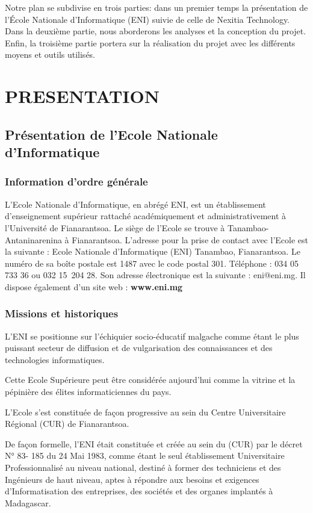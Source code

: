 \documentclass[12pt]{report}
\begin{document}
\begin{center}
\begin{minipage}{\textwidth}
					\hspace{15pt} Notre plan se subdivise en trois parties: dans un premier temps la présentation de l’École Nationale d'Informatique (ENI) suivie de celle de Nexitia Technology. Dans la deuxième partie, nous aborderons les analyses et la conception du projet. Enfin, la troisième partie portera sur la réalisation du projet avec les différents moyens et outils utilisés.
				\end{minipage}
			\end{center}
			\part{PRESENTATION}
			\chapter{Présentation de l’Ecole Nationale d’Informatique}
			\section{Information d’ordre générale }
				\hspace{15pt} L’Ecole Nationale d’Informatique, en abrégé ENI, est un établissement d’enseignement supérieur rattaché académiquement et administrativement à l’Université de Fianarantsoa. Le siège de l’Ecole se trouve à Tanambao-Antaninarenina à Fianarantsoa. L’adresse pour la prise de contact avec l’Ecole est la suivante : Ecole Nationale d’Informatique (ENI) Tanambao, Fianarantsoa. Le numéro de sa boîte postale est 1487 avec le code postal 301. Téléphone : 034 05 733 36 ou 032 15 204 28. Son adresse électronique est la suivante : eni@eni.mg. Il dispose également d'un site web : \textbf{www.eni.mg}
			\section{Missions et historiques}
				\hspace{15pt} L’ENI se positionne sur l’échiquier socio-éducatif malgache comme étant le plus puissant secteur de diffusion et de vulgarisation des connaissances et des technologies informatiques. 

				Cette Ecole Supérieure peut être considérée aujourd’hui comme la vitrine et la pépinière des élites informaticiennes du pays.
	
				L’Ecole s’est constituée de façon progressive au sein du Centre Universitaire Régional (CUR) de Fianarantsoa.

				De façon formelle, l’ENI était constituée et créée au sein du (CUR) par le décret N° 83- 185 du 24 Mai 1983, comme étant le seul établissement Universitaire Professionnalisé au niveau national, destiné à former des techniciens et des Ingénieurs de haut niveau, aptes à répondre aux besoins et exigences d’Informatisation des entreprises, des sociétés et des organes implantés à Madagascar.
\end{document}
